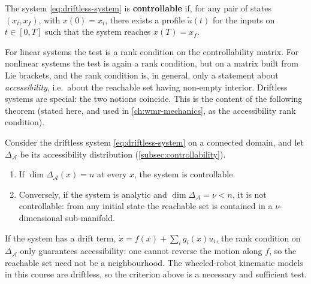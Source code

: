 \begin{definition}
\label{def:controllability-nonlinear}
The system \cref{eq:driftless-system} is \textbf{controllable} if, for
any pair of states \( (x_i, x_f) \), with \( x(0) = x_i \), there
exists a profile \( \tilde{u}(t) \) for the inputs on
\( t \in [0, T] \) such that the system reaches \( x(T) = x_f \).
\end{definition}

For linear systems the test is a rank condition on the controllability
matrix. For nonlinear systems the test is again a rank condition, but
on a matrix built from Lie brackets, and the rank condition is, in
general, only a statement about \emph{accessibility}, i.e.\ about the
reachable set having non-empty interior. Driftless systems are special:
the two notions coincide. This is the content of the following theorem
(stated here, and used in \cref{ch:wmr-mechanics}, as the
accessibility rank condition).

\begin{theorem}
\label{thm:accessibility}
Consider the driftless system \cref{eq:driftless-system} on a
connected domain, and let \( \Delta_{\mathcal{A}} \) be its
accessibility distribution (\cref{subsec:controllability}).
\begin{enumerate}
    \item If \( \dim \Delta_{\mathcal{A}}(x) = n \) at every \( x \),
          the system is controllable.
    \item Conversely, if the system is analytic and
          \( \dim \Delta_{\mathcal{A}} = \nu < n \), it is not
          controllable: from any initial state the reachable set is
          contained in a \( \nu \)-dimensional sub-manifold.
\end{enumerate}
\end{theorem}

\begin{nb}[Drift]
If the system has a drift term, \( \dot{x} = f(x) + \sum_i g_i(x)u_i \),
the rank condition on \( \Delta_{\mathcal{A}} \) only guarantees
accessibility: one cannot reverse the motion along \( f \), so the
reachable set need not be a neighbourhood. The wheeled-robot kinematic
models in this course are driftless, so the criterion above is a
necessary and sufficient test.
\end{nb}

